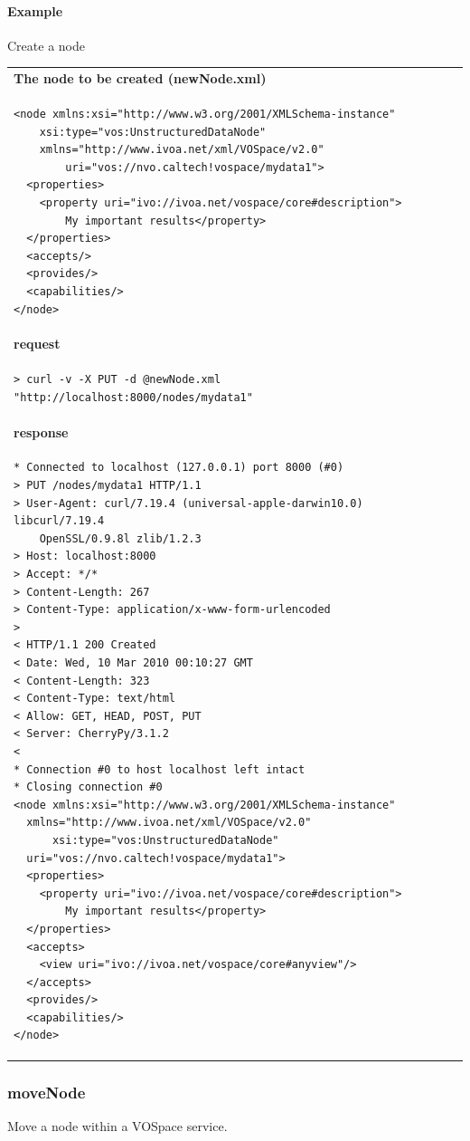 \documentclass[11pt,a4paper]{ivoa}
\begin{document}
\paragraph{Example}
Create a node

\begin{tabular}{ p{10cm} }
\\
\textbf{The node to be created (newNode.xml)} \\
\begin{lstlisting}
<node xmlns:xsi="http://www.w3.org/2001/XMLSchema-instance"
    xsi:type="vos:UnstructuredDataNode"
    xmlns="http://www.ivoa.net/xml/VOSpace/v2.0"
        uri="vos://nvo.caltech!vospace/mydata1">
  <properties>
    <property uri="ivo://ivoa.net/vospace/core#description">
        My important results</property>
  </properties>
  <accepts/>
  <provides/>
  <capabilities/>
</node>
\end{lstlisting} \\
\textbf{request} \\
\begin{lstlisting}
> curl -v -X PUT -d @newNode.xml "http://localhost:8000/nodes/mydata1"
\end{lstlisting} \\
\textbf{response} \\
\begin{lstlisting}
* Connected to localhost (127.0.0.1) port 8000 (#0)
> PUT /nodes/mydata1 HTTP/1.1
> User-Agent: curl/7.19.4 (universal-apple-darwin10.0) libcurl/7.19.4
    OpenSSL/0.9.8l zlib/1.2.3
> Host: localhost:8000
> Accept: */*
> Content-Length: 267
> Content-Type: application/x-www-form-urlencoded
> 
< HTTP/1.1 200 Created
< Date: Wed, 10 Mar 2010 00:10:27 GMT
< Content-Length: 323
< Content-Type: text/html
< Allow: GET, HEAD, POST, PUT
< Server: CherryPy/3.1.2
< 
* Connection #0 to host localhost left intact
* Closing connection #0
<node xmlns:xsi="http://www.w3.org/2001/XMLSchema-instance"
  xmlns="http://www.ivoa.net/xml/VOSpace/v2.0"
      xsi:type="vos:UnstructuredDataNode" 
  uri="vos://nvo.caltech!vospace/mydata1">
  <properties>
    <property uri="ivo://ivoa.net/vospace/core#description">
        My important results</property>
  </properties>
  <accepts>
    <view uri="ivo://ivoa.net/vospace/core#anyview"/>
  </accepts>
  <provides/>
  <capabilities/>
</node>
\end{lstlisting}
\end{tabular}

\subsubsection{moveNode}
Move a node within a VOSpace service.
\end{document}
